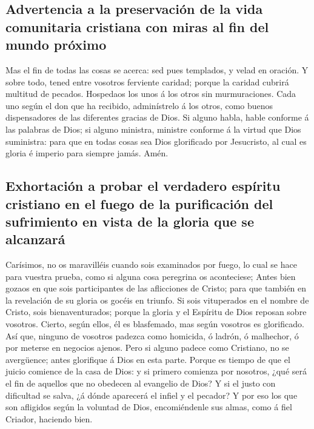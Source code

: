 \hypertarget{advertencia-a-la-preservaciuxf3n-de-la-vida-comunitaria-cristiana-con-miras-al-fin-del-mundo-pruxf3ximo}{%
\subsection{Advertencia a la preservación de la vida comunitaria
cristiana con miras al fin del mundo
próximo}\label{advertencia-a-la-preservaciuxf3n-de-la-vida-comunitaria-cristiana-con-miras-al-fin-del-mundo-pruxf3ximo}}

 Mas el fin de todas las cosas se acerca: sed pues
templados, y velad en oración.  Y sobre todo, tened entre
vosotros ferviente caridad; porque la caridad cubrirá multitud de
pecados.  Hospedaos los unos á los otros sin murmuraciones.
 Cada uno según el don que ha recibido, adminístrelo á los
otros, como buenos dispensadores de las diferentes gracias de Dios.
 Si alguno habla, hable conforme á las palabras de Dios; si
alguno ministra, ministre conforme á la virtud que Dios suministra: para
que en todas cosas sea Dios glorificado por Jesucristo, al cual es
gloria é imperio para siempre jamás. Amén.

\hypertarget{exhortaciuxf3n-a-probar-el-verdadero-espuxedritu-cristiano-en-el-fuego-de-la-purificaciuxf3n-del-sufrimiento-en-vista-de-la-gloria-que-se-alcanzaruxe1}{%
\subsection{Exhortación a probar el verdadero espíritu cristiano en el
fuego de la purificación del sufrimiento en vista de la gloria que se
alcanzará}\label{exhortaciuxf3n-a-probar-el-verdadero-espuxedritu-cristiano-en-el-fuego-de-la-purificaciuxf3n-del-sufrimiento-en-vista-de-la-gloria-que-se-alcanzaruxe1}}

 Carísimos, no os maravilléis cuando sois examinados por
fuego, lo cual se hace para vuestra prueba, como si alguna cosa
peregrina os aconteciese;  Antes bien gozaos en que sois
participantes de las aflicciones de Cristo; para que también en la
revelación de su gloria os gocéis en triunfo.  Si sois
vituperados en el nombre de Cristo, sois bienaventurados; porque la
gloria y el Espíritu de Dios reposan sobre vosotros. Cierto, según
ellos, él es blasfemado, mas según vosotros es glorificado.
 Así que, ninguno de vosotros padezca como homicida, ó
ladrón, ó malhechor, ó por meterse en negocios ajenos. 
Pero si alguno padece como Cristiano, no se avergüence; antes glorifique
á Dios en esta parte.  Porque es tiempo de que el juicio
comience de la casa de Dios: y si primero comienza por nosotros, ¿qué
será el fin de aquellos que no obedecen al evangelio de Dios?
 Y si el justo con dificultad se salva, ¿á dónde aparecerá
el infiel y el pecador?  Y por eso los que son afligidos
según la voluntad de Dios, encomiéndenle sus almas, como á fiel Criador,
haciendo bien.

